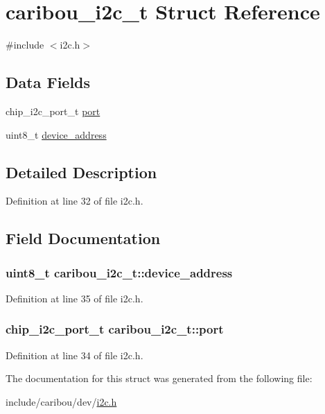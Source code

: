 \hypertarget{structcaribou__i2c__t}{\section{caribou\-\_\-i2c\-\_\-t Struct Reference}
\label{structcaribou__i2c__t}
}


{\ttfamily \#include $<$i2c.\-h$>$}

\subsection*{Data Fields}
\begin{DoxyCompactItemize}
\item 
chip\-\_\-i2c\-\_\-port\-\_\-t \hyperlink{structcaribou__i2c__t_af3ea37eae556cf758bc347d1dd6274b0}{port}
\item 
uint8\-\_\-t \hyperlink{structcaribou__i2c__t_a6231ff9a19bc1e0abef8f6d036ccef7f}{device\-\_\-address}
\end{DoxyCompactItemize}


\subsection{Detailed Description}


Definition at line 32 of file i2c.\-h.



\subsection{Field Documentation}
\hypertarget{structcaribou__i2c__t_a6231ff9a19bc1e0abef8f6d036ccef7f}{
\subsubsection[{device\-\_\-address}]{\setlength{\rightskip}{0pt plus 5cm}uint8\-\_\-t caribou\-\_\-i2c\-\_\-t\-::device\-\_\-address}}\label{structcaribou__i2c__t_a6231ff9a19bc1e0abef8f6d036ccef7f}


Definition at line 35 of file i2c.\-h.

\hypertarget{structcaribou__i2c__t_af3ea37eae556cf758bc347d1dd6274b0}{
\subsubsection[{port}]{\setlength{\rightskip}{0pt plus 5cm}chip\-\_\-i2c\-\_\-port\-\_\-t caribou\-\_\-i2c\-\_\-t\-::port}}\label{structcaribou__i2c__t_af3ea37eae556cf758bc347d1dd6274b0}


Definition at line 34 of file i2c.\-h.



The documentation for this struct was generated from the following file\-:\begin{DoxyCompactItemize}
\item 
include/caribou/dev/\hyperlink{i2c_8h}{i2c.\-h}\end{DoxyCompactItemize}
